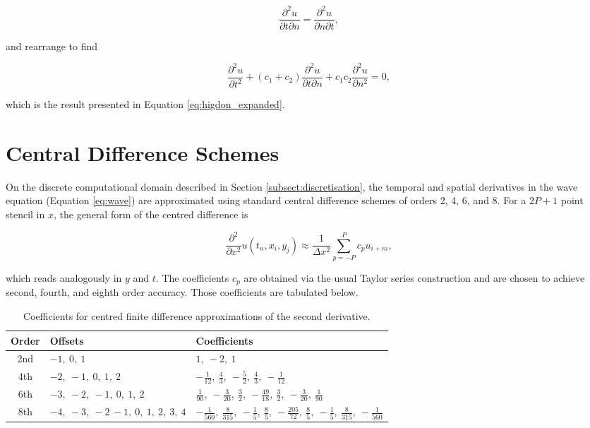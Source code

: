 \documentclass[final-report]{report-template}
\begin{document}
\begin{equation}
     \frac{\partial^2 u}{\partial t \partial n } =  \frac{\partial^2 u}{\partial n \partial t },
\end{equation}

and rearrange to find

\begin{equation}
    \frac{\partial^2 u}{\partial t^2} + 
    (c_1 + c_2) \frac{\partial^2 u}{\partial t \partial n } + 
    c_1 c_2 \frac{\partial^2 u}{\partial n^2} = 0,
\end{equation}

which is the result presented in Equation \eqref{eq:higdon_expanded}.

\section{Central Difference Schemes}
\label{app:central_diff}

On the discrete computational domain described in Section \ref{subsect:discretisation}, the temporal and spatial derivatives in the wave equation (Equation \ref{eq:wave}) are approximated using standard central difference schemes of orders 2, 4, 6, and 8. For a $2P + 1$ point stencil in $x$, the general form of the centred difference is

\begin{equation}
    \frac {\partial^2 } {\partial x^2}u(t_n, x_i, y_j) \approx \frac {1} {\Delta x^2} \sum^P_{p=-P}c_p u_{i+m},
\end{equation}

which reads analogously in $y$ and $t$. The coefficients $c_p$ are obtained via the usual Taylor series construction and are chosen to achieve second, fourth, and eighth order accuracy. Those coefficients are tabulated below.

\begin{table}[!htp]
\centering
\begin{tabular}{|c|l|l|}
    \hline
    Order & Offsets & Coefficients \\
    \hline
    2nd & $-1,\ 0 ,\ 1$ & $1,\ -2,\ 1$\\[3pt]
    4th & $-2,\ -1,\ 0 ,\ 1,\ 2$ & $-\frac{1}{12},\ \frac{4}{3},\ -\frac{5}{2},\ \frac{4}{3},\ -\frac{1}{12}$\\[3pt]
    6th & $-3,\ -2,\ -1,\ 0 ,\ 1,\ 2$ & $\frac{1}{90},\ -\frac{3}{20},\ \frac{3}{2},\ -\frac{49}{18},\ \frac{3}{2},\ -\frac{3}{20},\ \frac{1}{90}$\\[3pt]
    8th & $-4,\ -3,\ -2\, -1,\ 0 ,\ 1,\ 2,\ 3,\ 4$ & $-\frac{1}{560},\ \frac{8}{315},\ -\frac{1}{5},\ \frac{8}{5},\ -\frac{205}{72},\ \frac{8}{5},\ -\frac{1}{5},\ \frac{8}{315},\ -\frac{1}{560}$ \\[3pt] \hline
\end{tabular}
\caption{Coefficients for centred finite difference approximations of the second derivative.}
\label{tab:fd_coefficients}
\end{table}
\end{document}
